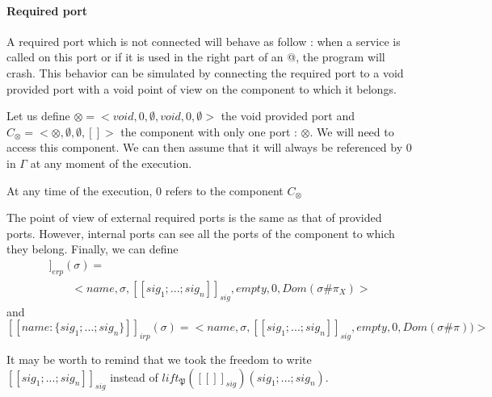 \paragraph{Required port}
A required port which is not connected will behave as follow : when a service is called on this port or if it is used in the right part of an @, the program will crash. This behavior can be simulated by connecting the required port to a void provided port with a void point of view on the component to which it belongs. 

Let us define  $\otimes = <void,0,\emptyset,void,0,\emptyset>$ the void provided port and $C_{\otimes} = <{\otimes},\emptyset,\emptyset,[]>$  the component with only one port : $\otimes$.
We will need to access this component. We can then assume that it will always be referenced by 0 in $\Gamma$ at any moment of the execution.

\begin{inv} At any time of the execution, $0$ refers to the component $C_{\otimes}$ \end{inv}

The point of view of external required ports is the same as that of provided ports. However, internal ports can see all the ports of the component to which they belong. Finally, we can define
\begin{multline*}
[\![name:\{sig_1; ... ; sig_n\}]\!]_{erp}(\sigma) =\\
\qquad <name,\sigma,[\![sig_1; ... ; sig_n]\!]_{sig}, empty, 0,Dom(\sigma\#\pi_X) >
\end{multline*}
and
\[[\![name:\{sig_1; ... ; sig_n\}]\!]_{irp}(\sigma) = <name,\sigma,[\![sig_1; ... ; sig_n]\!]_{sig}, empty, 0,Dom(\sigma\#\pi))>
\]

It may be worth to remind that we took the freedom to write $[\![sig_1; ... ; sig_n]\!]_{sig}$ instead of $lift_\mathfrak{P}([\![]\!]_{sig})(sig_1; ... ; sig_n)$.


